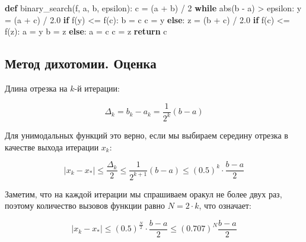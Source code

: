 \documentclass[
  russian,
  letterpaper,
  DIV=11,
  numbers=noendperiod]{scrartcl}
\newenvironment{Shaded}{\begin{snugshade}}{\end{snugshade}}
\newcommand{\BuiltInTok}[1]{\textcolor[rgb]{0.00,0.23,0.31}{#1}}
\newcommand{\ControlFlowTok}[1]{\textcolor[rgb]{0.00,0.23,0.31}{\textbf{#1}}}
\newcommand{\DecValTok}[1]{\textcolor[rgb]{0.68,0.00,0.00}{#1}}
\newcommand{\FloatTok}[1]{\textcolor[rgb]{0.68,0.00,0.00}{#1}}
\newcommand{\KeywordTok}[1]{\textcolor[rgb]{0.00,0.23,0.31}{\textbf{#1}}}
\newcommand{\NormalTok}[1]{\textcolor[rgb]{0.00,0.23,0.31}{#1}}
\newcommand{\OperatorTok}[1]{\textcolor[rgb]{0.37,0.37,0.37}{#1}}
\begin{document}
\begin{Shaded}
\begin{Highlighting}[]
\KeywordTok{def}\NormalTok{ binary\_search(f, a, b, epsilon):}
\NormalTok{   c }\OperatorTok{=}\NormalTok{ (a }\OperatorTok{+}\NormalTok{ b) }\OperatorTok{/} \DecValTok{2}
      \ControlFlowTok{while} \BuiltInTok{abs}\NormalTok{(b }\OperatorTok{{-}}\NormalTok{ a) }\OperatorTok{\textgreater{}}\NormalTok{ epsilon:}
\NormalTok{         y }\OperatorTok{=}\NormalTok{ (a }\OperatorTok{+}\NormalTok{ c) }\OperatorTok{/} \FloatTok{2.0}
         \ControlFlowTok{if}\NormalTok{ f(y) }\OperatorTok{\textless{}=}\NormalTok{ f(c):}
\NormalTok{            b }\OperatorTok{=}\NormalTok{ c}
\NormalTok{            c }\OperatorTok{=}\NormalTok{ y}
         \ControlFlowTok{else}\NormalTok{:}
\NormalTok{            z }\OperatorTok{=}\NormalTok{ (b }\OperatorTok{+}\NormalTok{ c) }\OperatorTok{/} \FloatTok{2.0}
         \ControlFlowTok{if}\NormalTok{ f(c) }\OperatorTok{\textless{}=}\NormalTok{ f(z):}
\NormalTok{            a }\OperatorTok{=}\NormalTok{ y}
\NormalTok{            b }\OperatorTok{=}\NormalTok{ z}
         \ControlFlowTok{else}\NormalTok{:}
\NormalTok{            a }\OperatorTok{=}\NormalTok{ c}
\NormalTok{            c }\OperatorTok{=}\NormalTok{ z}
      \ControlFlowTok{return}\NormalTok{ c}
\end{Highlighting}
\end{Shaded}

\subsection{Метод дихотомии.
Оценка}\label{ux43cux435ux442ux43eux434-ux434ux438ux445ux43eux442ux43eux43cux438ux438.-ux43eux446ux435ux43dux43aux430}

Длина отрезка на \(k\)-й итерации:

\[
\Delta_{k} = b_{k} - a_{k} = \dfrac{1}{2^k}(b-a)
\]

Для унимодальных функций это верно, если мы выбираем середину отрезка в
качестве выхода итерации \(x_{k}\):

\[
|x_{k} - x_*| \leq \dfrac{\Delta_{k}}{2} \leq \dfrac{1}{2^{k+1}}(b-a) \leq (0.5)^{k} \cdot  \frac{b-a}{2}
\]

Заметим, что на каждой итерации мы спрашиваем оракул не более двух раз,
поэтому количество вызовов функции равно \(N = 2 \cdot k\), что
означает:

\[
|x_{k} - x_*| \leq (0.5)^{\frac{N}{2}} \cdot \frac{b-a}{2} \leq  (0.707)^{N}  \frac{b-a}{2}
\]
\end{document}
